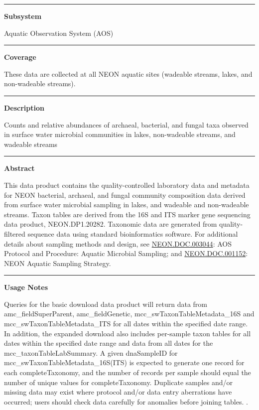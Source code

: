 \documentclass[]{article}
\begin{document}
\begin{center}\rule{0.5\linewidth}{\linethickness}\end{center}

\textbf{Subsystem}

Aquatic Observation System (AOS)

\begin{center}\rule{0.5\linewidth}{\linethickness}\end{center}

\textbf{Coverage}

These data are collected at all NEON aquatic sites (wadeable streams,
lakes, and non-wadeable streams).

\begin{center}\rule{0.5\linewidth}{\linethickness}\end{center}

\textbf{Description}

Counts and relative abundances of archaeal, bacterial, and fungal taxa
observed in surface water microbial communities in lakes, non-wadeable
streams, and wadeable streams

\begin{center}\rule{0.5\linewidth}{\linethickness}\end{center}

\textbf{Abstract}

This data product contains the quality-controlled laboratory data and
metadata for NEON bacterial, archaeal, and fungal community composition
data derived from surface water microbial sampling in lakes, and
wadeable and non-wadeable streams. Taxon tables are derived from the 16S
and ITS marker gene sequencing data product, NEON.DP1.20282. Taxonomic
data are generated from quality-filtered sequence data using standard
bioinformatics software. For additional details about sampling methods
and design, see
\href{http://data.neonscience.org/api/v0/documents/NEON.DOC.003044vB}{NEON.DOC.003044}:
AOS Protocol and Procedure: Aquatic Microbial Sampling; and
\href{http://data.neonscience.org/api/v0/documents/NEON.DOC.001152vA}{NEON.DOC.001152}:
NEON Aquatic Sampling Strategy.

\begin{center}\rule{0.5\linewidth}{\linethickness}\end{center}

\textbf{Usage Notes}

Queries for the basic download data product will return data from
amc\_fieldSuperParent, amc\_fieldGenetic, mcc\_swTaxonTableMetadata\_16S
and mcc\_swTaxonTableMetadata\_ITS for all dates within the specified
date range. In addition, the expanded download also includes per-sample
taxon tables for all dates within the specified date range and data from
all dates for the mcc\_taxonTableLabSummary. A given dnaSampleID for
mcc\_swTaxonTableMetadata\_16S(ITS) is expected to generate one record
for each completeTaxonomy, and the number of records per sample should
equal the number of unique values for completeTaxonomy. Duplicate
samples and/or missing data may exist where protocol and/or data entry
aberrations have occurred; users should check data carefully for
anomalies before joining tables. \newpage
.
\end{document}
